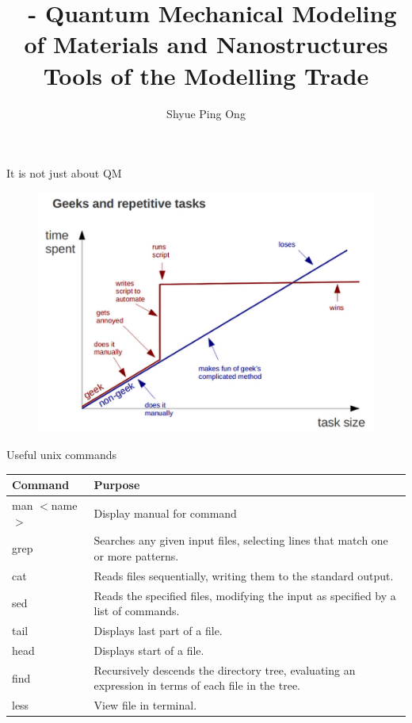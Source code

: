 \documentclass[aspectratio=169]{beamer}
\title[\classname Tools of the Modelling Trade]{\classname~- Quantum Mechanical Modeling of Materials and Nanostructures\\Tools of the Modelling Trade}
\author{Shyue Ping Ong}
\institute[UCSD]{University of California, San Diego\\
\medskip
}
\date{\classyear} %
\begin{document}
    \begin{frame}
        \titlepage %
    \end{frame}

    \begin{frame}{It is not just about QM}
        \begin{figure}
    \centering
        \centering
        \includegraphics[width=0.6\linewidth]{lectures/figures/9_geeks.png}
    
\end{figure} 
    \end{frame}

\begin{frame}{Useful unix commands}

\begin{table}[h]
    \centering
    \begin{tabular}{l|p{12cm}}

    \textbf{Command} & \textbf{Purpose}\\
    \hline
man $<$name$>$& Display manual for command\\
grep & Searches any given input files, selecting lines that match one or more patterns.\\
cat & Reads files sequentially, writing them to the standard output. \\
sed & Reads the specified files, modifying the input as specified by a list of commands.\\
tail & Displays last part of a file.\\
head & Displays start of a file.\\
find & Recursively descends the directory tree, evaluating an expression in terms of each file in the tree.\\
less & View file in terminal.
    \end{tabular}
\end{table}

\end{frame} 
\end{document}
